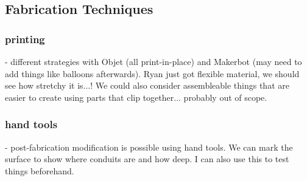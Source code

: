 \subsection{Fabrication Techniques}

\subsubsection{printing} - different strategies with Objet (all print-in-place) and Makerbot (may need to add things like balloons afterwards).  Ryan just got flexible material, we should see how stretchy it is...!  We could also consider assembleable things that are easier to create using parts that clip together... probably out of scope.

\subsubsection{hand tools} - post-fabrication modification is possible using hand tools.  We can mark the surface to show where conduits are and how deep.  I can also use this to test things beforehand.